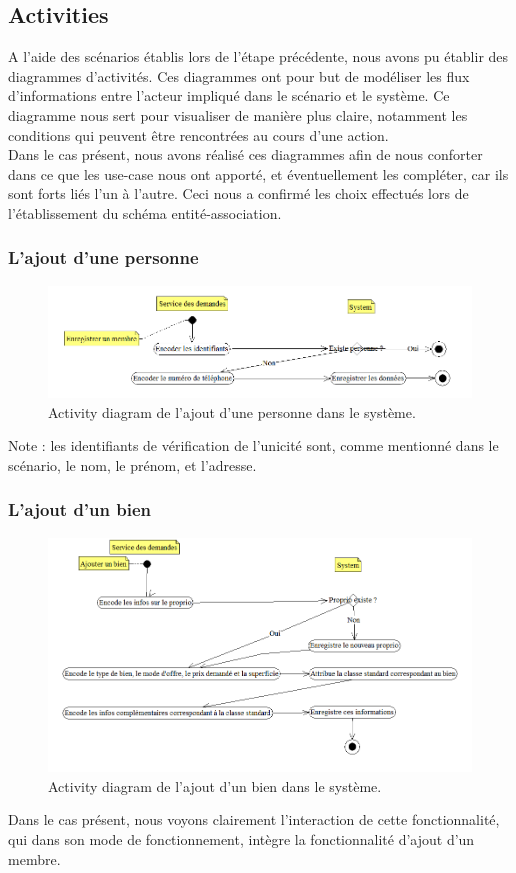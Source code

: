 \mbox{}
\subsection{Activities}
A l'aide des scénarios établis lors de l'étape précédente, nous avons pu établir des diagrammes d'activités. Ces diagrammes ont pour but de modéliser les flux d'informations entre l'acteur impliqué dans le scénario et le système.
Ce diagramme nous sert pour visualiser de manière plus claire, notamment les conditions qui peuvent être rencontrées au cours d'une action.\\

Dans le cas présent, nous avons réalisé ces diagrammes afin de nous conforter dans ce que les use-case nous ont apporté, et éventuellement les compléter, car ils sont forts liés l'un à l'autre. Ceci nous a confirmé les choix effectués lors de l'établissement du schéma entité-association.

\subsubsection{L'ajout d'une personne}
\begin{figure}[H]
\centering
\includegraphics[width=16cm]{ajoutMembre.png}
\caption{Activity diagram de l'ajout d'une personne dans le système.}
\label{fig:ajoutMembre}
\end{figure}

Note : les identifiants de vérification  de l'unicité sont, comme mentionné dans le scénario, le nom, le prénom, et l'adresse.

\subsubsection{L'ajout d'un bien}
\begin{figure}[H]
\centering
\includegraphics[width=16cm]{ajoutBien.png}
\caption{Activity diagram de l'ajout d'un bien dans le système.}
\label{fig:ajoutBien}
\end{figure}
Dans le cas présent, nous voyons clairement l'interaction de cette fonctionnalité, qui dans son mode de fonctionnement, intègre la fonctionnalité d'ajout d'un membre.

